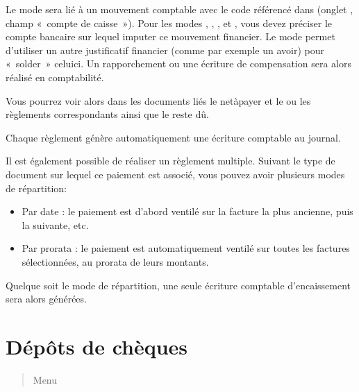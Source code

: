 \documentclass[a4paper,10pt,oneside,french]{sphinxmanual}
\begin{document}
\sphinxAtStartPar
Le mode  sera lié à un mouvement comptable avec le code référencé dans  (onglet , champ « compte de caisse »).
Pour les modes , , ,  et , vous devez préciser le compte bancaire sur lequel imputer ce mouvement financier.
Le mode  permet d’utiliser un autre justificatif financier (comme par exemple un avoir) pour « solder » celui\sphinxhyphen{}ci. Un rapporchement ou une écriture de compensation sera alors réalisé en comptabilité.

\sphinxAtStartPar
Vous pourrez voir alors dans les documents liés le net\sphinxhyphen{}à\sphinxhyphen{}payer et le ou les règlements correspondants ainsi que le reste dû.

\sphinxAtStartPar
Chaque règlement génère automatiquement une écriture comptable au journal.

\sphinxAtStartPar
Il est également possible de réaliser un règlement multiple.
Suivant le type de document sur lequel ce paiement est associé, vous pouvez avoir plusieurs modes de répartition:
\begin{itemize}
\item {} 
\sphinxAtStartPar
Par date : le paiement est d’abord ventilé sur la facture la plus ancienne, puis la suivante, etc.

\item {} 
\sphinxAtStartPar
Par prorata : le paiement est automatiquement ventilé sur toutes les factures sélectionnées, au prorata de leurs montants.
\begin{quote}

\noindent{}
\end{quote}

\end{itemize}

\sphinxAtStartPar
Quelque soit le mode de répartition, une seule écriture comptable d’encaissement sera alors générées.

\sphinxstepscope


\section{Dépôts de chèques}
\label{\detokenize{payoff/deposit:depots-de-cheques}}\label{\detokenize{payoff/deposit::doc}}\begin{quote}

\sphinxAtStartPar
Menu 
\end{quote}
\end{document}
